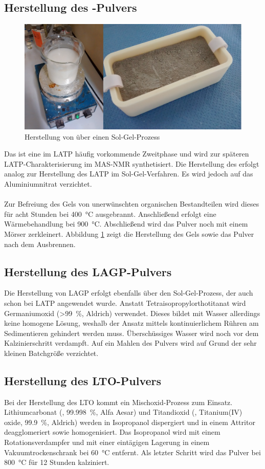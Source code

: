 \documentclass[a4paper, 11pt, headsepline,footsepline,twoside,abstract]{scrbook}
\begin{document}
\subsection{Herstellung des -Pulvers}
\label{praep_LiTiOPO4}
\begin{figure}
	\centering
	\includegraphics[width=1.0\columnwidth]{images/SolGel.jpg}
	\caption{Herstellung von  über einen Sol-Gel-Prozess}
	\label{sol_gel}
\end{figure}
Das  ist eine im LATP häufig vorkommende Zweitphase und wird zur späteren LATP-Charakterisierung im MAS-NMR synthetisiert. Die Herstellung des  erfolgt analog zur Herstellung des LATP im Sol-Gel-Verfahren. Es wird jedoch auf das Aluminiumnitrat verzichtet.
\\\\
Zur Befreiung des Gels von unerwünschten organischen Bestandteilen wird dieses für acht Stunden bei \SI{400}{\celsius} ausgebrannt. Anschließend erfolgt eine Wärmebehandlung bei \SI{900}{\celsius}. Abschließend wird das Pulver noch mit einem Mörser zerkleinert. Abbildung \ref{sol_gel} zeigt die Herstellung des Gels sowie das Pulver nach dem Ausbrennen.
\subsection{Herstellung des LAGP-Pulvers}
\label{praep_LAGP}
Die Herstellung von LAGP erfolgt ebenfalls über den Sol-Gel-Prozess, der auch schon bei LATP angewendet wurde. Anstatt Tetra\-iso\-propyl\-ortho\-titanat wird Germaniumoxid (\SI{>99}{\percent}, Aldrich) verwendet. Dieses bildet mit Wasser allerdings keine homogene Lösung, weshalb der Ansatz mittels kontinuierlichem Rühren am Sedimentieren gehindert werden muss. Überschüssiges Wasser wird noch vor dem Kalzinierschritt verdampft. Auf ein Mahlen des Pulvers wird auf Grund der sehr kleinen Batchgröße verzichtet.
\subsection{Herstellung des LTO-Pulvers}
\label{praep_LTO}
Bei der Herstellung des LTO kommt ein Mischoxid-Prozess zum Einsatz. Lithiumcarbonat (, \SI{99.998}{\percent}, Alfa Aesar) und Titandioxid (, Titanium(IV) oxide, \SI{99.9}{\percent}, Aldrich) werden in Isopropanol dispergiert und in einem Attritor deagglomeriert sowie homogenisiert. Das Isopropanol wird mit einem Rotationsverdampfer und mit einer eintägigen Lagerung in einem Vakuumtrockenschrank bei \SI{60}{\celsius} entfernt. Als letzter Schritt wird das Pulver bei \SI{800}{\celsius} für 12 Stunden kalziniert.
\end{document}
